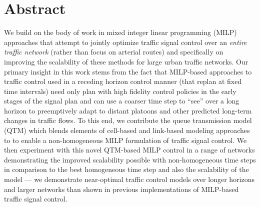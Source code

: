 \section*{Abstract}


We build on the body of work in mixed integer linear programming
(MILP) approaches that attempt to jointly optimize traffic signal
control over an \emph{entire traffic network} (rather than focus on
arterial routes) and specifically on improving the scalability of
these methods for large urban traffic networks.  Our primary insight
in this work stems from the fact that MILP-based approaches to traffic
control used in a receding horizon control manner (that replan at
fixed time intervals) need only plan with high fidelity control
policies in the early stages of the signal plan and can use a coarser
time step to ``see'' over a long horizon to preemptively adapt to
distant platoons and other predicted long-term changes in traffic
flows.  To this end, we contribute the queue transmission model (QTM)
which blends elements of cell-based and link-based modeling approaches
to to enable a non-homogeneous MILP formulation of traffic signal
control.  We then experiment with this novel QTM-based MILP control in
a range of networks demonstrating the improved scalability possible
with non-homogeneous time steps in comparison to the best homogeneous
time step and also the scalability of the model --- we demonstrate
near-optimal traffic control models over longer horizons and larger
networks than shown in previous implementations of MILP-based traffic
signal control.


